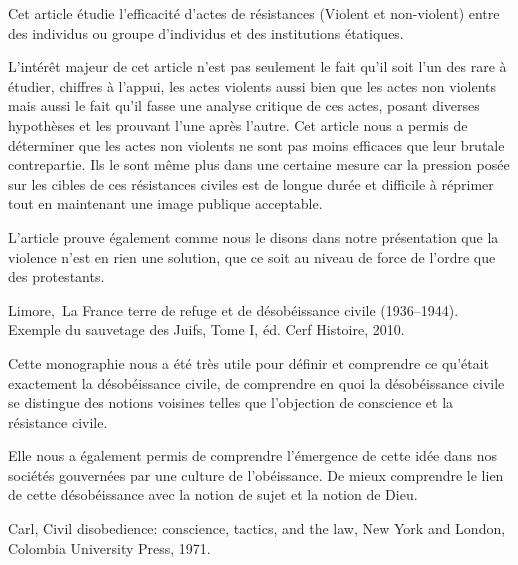 \documentclass[a4paper, 11pt]{article}
\begin{document}
    \begin{framed}
        Cet article étudie l'efficacité d'actes de résistances (Violent et
        non-violent) entre des individus ou groupe d'individus et des
        institutions étatiques. \newline

        L'intérêt majeur de cet article n'est pas seulement le fait qu'il soit
        l'un des rare à étudier, chiffres à l’appui,  les actes violents aussi
        bien que les actes non violents mais aussi le fait qu’il fasse une
        analyse critique de ces actes, posant diverses hypothèses et les
        prouvant l’une après l’autre. \newline
        Cet article nous a permis de déterminer que les actes non violents ne
        sont pas moins efficaces que leur brutale contrepartie. Ils le sont
        même plus dans une certaine mesure car la pression posée sur les cibles
        de ces résistances civiles est de longue durée et difficile à réprimer
        tout en maintenant une image publique acceptable. \newline

        L’article prouve également comme nous le disons dans notre présentation
        que la violence n’est en rien une solution, que ce soit au niveau de
        force de l’ordre que des protestants.
    \end{framed}


     Limore, La France terre de refuge et de désobéissance civile
    (1936--1944). Exemple du sauvetage des Juifs, Tome I, éd. Cerf Histoire,
    2010.

    \begin{framed}
        Cette monographie nous a été très utile pour définir et comprendre ce
        qu’était exactement la désobéissance civile, de comprendre en quoi la
        désobéissance civile se distingue des notions voisines telles que
        l’objection de conscience et la résistance civile. \newline

        Elle nous a également permis de comprendre l’émergence de cette idée
        dans nos sociétés gouvernées par une culture de l’obéissance. De mieux
        comprendre le lien de cette désobéissance avec la notion de sujet et la
        notion de Dieu.
    \end{framed}

     Carl, Civil disobedience: conscience, tactics, and the law,
    New York and London, Colombia University Press, 1971.
\end{document}
